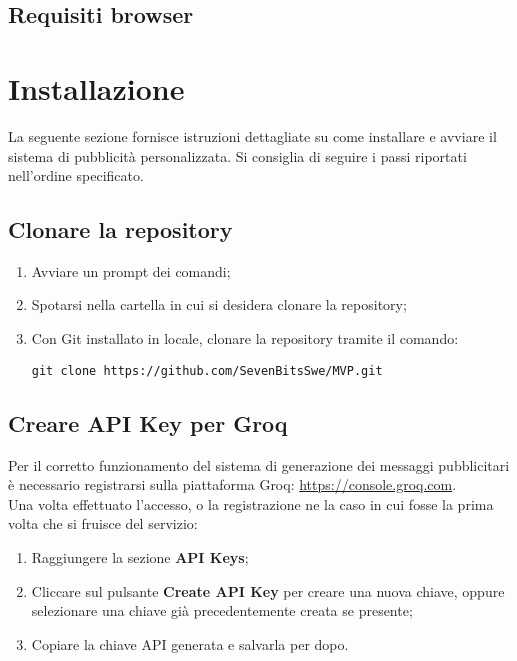\documentclass[10pt]{article}
\begin{document}
\begin{justify}
\subsection{Requisiti browser}



\section{Installazione}
\label{sec:installazione}
La seguente sezione fornisce istruzioni dettagliate su come installare e avviare il sistema di pubblicità personalizzata. Si consiglia di seguire i passi riportati nell'ordine specificato.

\subsection{Clonare la repository}
\begin{enumerate}
    \item Avviare un prompt dei comandi;
    \item Spotarsi nella cartella in cui si desidera clonare la repository;
    \item Con Git installato in locale, clonare la repository tramite il comando:
\begin{verbatim}
git clone https://github.com/SevenBitsSwe/MVP.git
\end{verbatim}
\end{enumerate}

\subsection{Creare API Key per Groq}
Per il corretto funzionamento del sistema di generazione dei messaggi pubblicitari è necessario registrarsi sulla piattaforma Groq: \url{https://console.groq.com}.\\
Una volta effettuato l'accesso, o la registrazione ne la caso in cui fosse la prima volta che si fruisce del servizio:
\begin{enumerate}
    \item Raggiungere la sezione \textbf{API Keys};
    \item Cliccare sul pulsante \textbf{Create API Key} per creare una nuova chiave, oppure selezionare una chiave già precedentemente creata se presente;
    \item Copiare la chiave API generata e salvarla per dopo.
\end{enumerate}


\end{justify}
\end{document}
